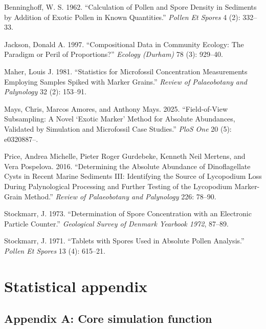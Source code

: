 \documentclass[
  12pt,
]{article}
\newlength{\cslhangindent}
\newenvironment{CSLReferences}[2] %
 {\begin{list}{}{%
  \setlength{\itemindent}{0pt}
  \setlength{\leftmargin}{0pt}
  \setlength{\parsep}{0pt}
  \ifodd #1
   \setlength{\leftmargin}{\cslhangindent}
   \setlength{\itemindent}{-1\cslhangindent}
  \fi
  \setlength{\itemsep}{#2\baselineskip}}}
 {\end{list}}
\begin{document}
\label{refs}
\begin{CSLReferences}{1}{0}
Benninghoff, W. S. 1962. {``Calculation of Pollen and Spore Density in
Sediments by Addition of Exotic Pollen in Known Quantities.''}
\emph{Pollen Et Spores} 4 (2): 332--33.

Jackson, Donald A. 1997. {``Compositional Data in Community Ecology: The
Paradigm or Peril of Proportions?''} \emph{Ecology (Durham)} 78 (3):
929--40.

Maher, Louis J. 1981. {``Statistics for Microfossil Concentration
Measurements Employing Samples Spiked with Marker Grains.''}
\emph{Review of Palaeobotany and Palynology} 32 (2): 153--91.

Mays, Chris, Marcos Amores, and Anthony Mays. 2025. {``Field-of-View
Subsampling: A Novel {`Exotic Marker'} Method for Absolute Abundances,
Validated by Simulation and Microfossil Case Studies.''} \emph{PloS One}
20 (5): e0320887--.

Price, Andrea Michelle, Pieter Roger Gurdebeke, Kenneth Neil Mertens,
and Vera Pospelova. 2016. {``Determining the Absolute Abundance of
Dinoflagellate Cysts in Recent Marine Sediments III: Identifying the
Source of Lycopodium Loss During Palynological Processing and Further
Testing of the Lycopodium Marker-Grain Method.''} \emph{Review of
Palaeobotany and Palynology} 226: 78--90.

Stockmarr, J. 1973. {``Determination of Spore Concentration with an
Electronic Particle Counter.''} \emph{Geological Survey of Denmark
Yearbook 1972}, 87--89.

Stockmarr, J. 1971. {``Tablets with Spores Used in Absolute Pollen
Analysis.''} \emph{Pollen Et Spores} 13 (4): 615--21.

\end{CSLReferences}

\newpage

\section{Statistical appendix}\label{statistical-appendix}

\subsection{Appendix A: Core simulation
function}\label{appendix-a-core-simulation-function}
\end{document}

